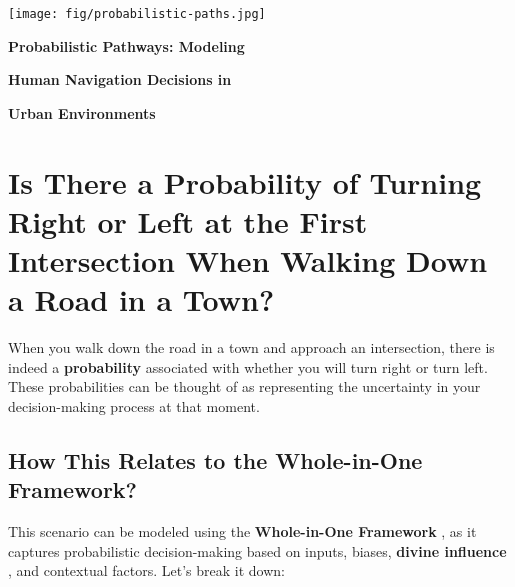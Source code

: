 \documentclass{article}
\newcommand{\bn}{\bigskip\noindent}
\newcommand{\mn}{\medskip\noindent}
\begin{document}
\begin{center}
\texttt{[image: fig/probabilistic-paths.jpg]}
\end{center}

\mn
{\huge\bf Probabilistic Pathways: Modeling}

\bn
{\huge\bf Human Navigation Decisions in}

\bn
{\huge\bf Urban Environments}

\bn

\section*{Is There a Probability of Turning Right or Left at the First Intersection When Walking Down a Road in a Town?}


When you walk down the road in a town and approach an intersection, there is indeed a {\bf probability}  associated with whether you will turn right or turn left. These probabilities can be thought of as representing the uncertainty in your decision-making process at that moment.



\subsection*{How This Relates to the Whole-in-One Framework?}

This scenario can be modeled using the {\bf Whole-in-One Framework} , as it captures probabilistic decision-making based on inputs, biases, {\bf divine influence} , and contextual factors. Let's break it down:
\end{document}
